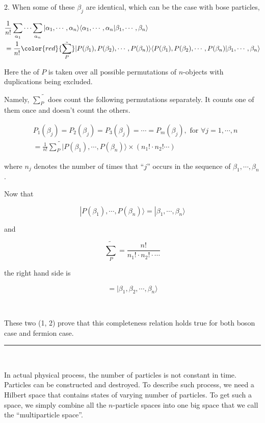 {\Huge 2. }When some of these $\beta_j$ are identical, which can be the case with bose particles, 

\[\begin{split}
&\frac{1}{n!}\sum_{\alpha_1}\cdots\sum_{\alpha_n}|\alpha_1,\cdots,\alpha_n\rangle\langle\alpha_1,\cdots,\alpha_n|\beta_1,\cdots,\beta_n\rangle \\
&= \frac{1}{n!}{\color{red}{\tilde{\sum_P}}}|P(\beta_1),P(\beta_2),\cdots,P(\beta_n)\rangle\langle P(\beta_1),P(\beta_2),\cdots,P(\beta_n)|\beta_1,\cdots,\beta_n\rangle \end{split}\]

Here the {\color{red}{summation}} of $P$ is taken over all possible permutations of $n$-objects with duplications being excluded. 

Namely, $\tilde{\sum_P}$ does count the following permutations separately. It counts one of them once and doesn't count the others. 

\[
\begin{split}
&P_1(\beta_j) = P_2(\beta_j) = P_3(\beta_j)=\cdots=P_m(\beta_j), \text{ for }\forall j = 1,\cdots,n\\ 
&=\frac{1}{n!}\tilde{\sum_P}|P(\beta_1),\cdots,P(\beta_n)\rangle\times(n_1!\cdot n_2!\cdots)
\end{split}\]

where $n_j$ denotes the number of times that ``$j$'' occurs in the sequence of $\beta_1,\cdots,\beta_n$. 

Now that 

\[|P(\beta_1),\cdots,P(\beta_n)\rangle = |\beta_1,\cdots,\beta_n\rangle \]

and

\[\tilde{\sum_P} = \frac{n!}{n_1!\cdot n_2!\cdot\cdots} \]

the right hand side is

\[=|\beta_1,\beta_2,\cdots,\beta_n\rangle \]

\ 

These two ({\Huge 1, 2}) prove that this completeness relation holds true for both boson case and fermion case. \\

\hrule

\ 

In actual physical process, the number of particles is not constant in time. Particles can be constructed and destroyed. To describe such process, we need a Hilbert space that contains states of varying number of particles. To get such a space, we simply combine all the $n$-particle spaces into one big space that we call the ``multiparticle space''. 

